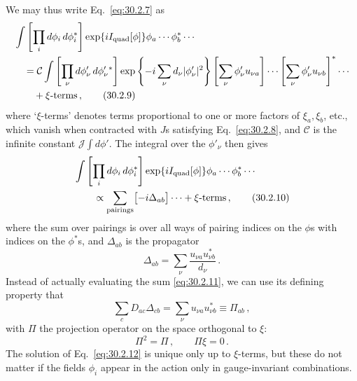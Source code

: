 We may thus write Eq.~\eqref{eq:30.2.7} as
\begin{align}
  &\int\left[\prod_i d\phi_i\,d\phi_i^*\right]
    \exp\{iI_{\mathrm{quad}}[\phi]\}
    \phi_a\cdots\phi_b^*\cdots
  \notag\\
  &\quad={}
    \mathcal{C}\int
    \left[\prod_\nu d\phi'_\nu\,d\phi_\nu'{}^*\right]
    \exp\left\{-i\sum_\nu d_\nu|\phi'_\nu|^2\right\}
    \left[\sum_\nu\phi'_\nu u_{\nu a}\right]\cdots
    \left[\sum_\nu\phi'_\nu u_{\nu b}\right]^*
    \cdots
  \notag\\
  &\qquad+\xi\text{-terms}\,,
  \tag{30.2.9}\label{eq:30.2.9}
\end{align}
where `\(\xi\)-terms' denotes terms proportional to one or more factors of
\(\xi_a,\xi_b\), etc., which vanish when contracted with \(J\)s satisfying
Eq.~\eqref{eq:30.2.8}, and \(\mathcal{C}\) is the infinite constant
\(\mathcal{J}\int d\phi'\). The integral over the \(\phi'_\nu\) then gives
\begin{align}
  &\int\left[\prod_i d\phi_i\,d\phi_i^*\right]
    \exp\{iI_{\mathrm{quad}}[\phi]\}
    \phi_a\cdots\phi_b^*\cdots
  \notag\\
  &\qquad\propto
    \sum_{\text{pairings}}\bigl[-i\Delta_{ab}\bigr]\cdots
    +\xi\text{-terms}\,,
  \tag{30.2.10}\label{eq:30.2.10}
\end{align}
where the sum over pairings is over all ways of pairing indices on the
\(\phi\)s with indices on the \(\phi^*\)s, and \(\Delta_{ab}\) is the
propagator
\begin{equation}
  \Delta_{ab}=\sum_\nu\frac{u_{\nu a}u_{\nu b}^*}{d_\nu}\,.
  \tag{30.2.11}\label{eq:30.2.11}
\end{equation}
Instead of actually evaluating the sum \eqref{eq:30.2.11}, we can use its
defining property that
\begin{equation}
  \sum_cD_{ac}\Delta_{cb}
  =\sum_\nu u_{\nu a}u_{\nu b}^*
  \equiv\Pi_{ab}\,,
  \tag{30.2.12}\label{eq:30.2.12}
\end{equation}
with \(\Pi\) the projection operator on the space orthogonal to \(\xi\):
\begin{equation}
  \Pi^2=\Pi\,,
  \qquad
  \Pi\xi=0\,.
  \tag{30.2.13}\label{eq:30.2.13}
\end{equation}
The solution of Eq.~\eqref{eq:30.2.12} is unique only up to \(\xi\)-terms,
but these do not matter if the fields \(\phi_i\) appear in the action only in
gauge-invariant combinations.

